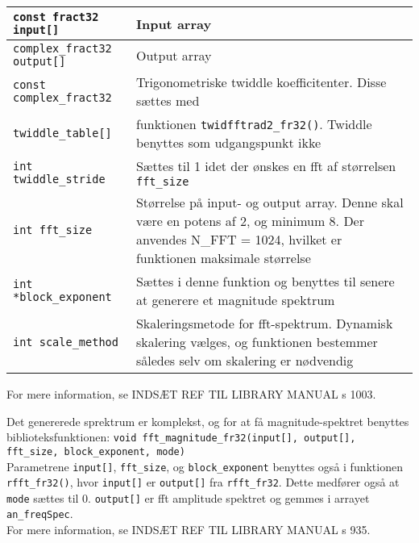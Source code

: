 \begin{center}
    \begin{tabular}{ | l | p{} |}
    \hline
    \verb+const fract32 input[]+		& Input array					\\ \hline
    \verb+complex_fract32 output[]+ 	& Output array					\\ \hline
    \verb+const complex_fract32+ 		& Trigonometriske twiddle koefficitenter. Disse sættes med   \\
    	\verb+twiddle_table[]+  			& funktionen \verb+twidfftrad2_fr32()+. Twiddle benyttes som udgangspunkt ikke 	\\ \hline
    \verb+int twiddle_stride+			& Sættes til 1 idet der ønskes en fft af størrelsen \verb+fft_size+	\\ \hline
	\verb+int fft_size+    				& Størrelse på input- og output array. Denne skal være en potens af 2, og minimum 8. Der anvendes N\_FFT = 1024, hvilket er funktionen maksimale størrelse\\ \hline
	\verb+int *block_exponent+			& Sættes i denne funktion og benyttes til senere at generere et magnitude spektrum\\ \hline
	\verb+int scale_method+		& Skaleringsmetode for fft-spektrum. Dynamisk skalering vælges, og funktionen bestemmer således selv om skalering er nødvendig \\ \hline
    \end{tabular}
\end{center}
For mere information, se INDSÆT REF TIL LIBRARY MANUAL s 1003. 

Det genererede sprektrum er komplekst, og for at få magnitude-spektret benyttes biblioteksfunktionen:
\verb+void fft_magnitude_fr32(input[], output[], fft_size, block_exponent, mode)+ \\
Parametrene \verb+input[]+, \verb+fft_size+, og \verb+block_exponent+ benyttes også i funktionen \verb+rfft_fr32()+, hvor \verb+input[]+ er \verb+output[]+ fra \verb+rfft_fr32+. Dette medfører også at \verb+mode+ sættes til 0. \verb+output[]+ er fft amplitude spektret og gemmes i arrayet \verb+an_freqSpec+. \\
For mere information, se INDSÆT REF TIL LIBRARY MANUAL s 935.

